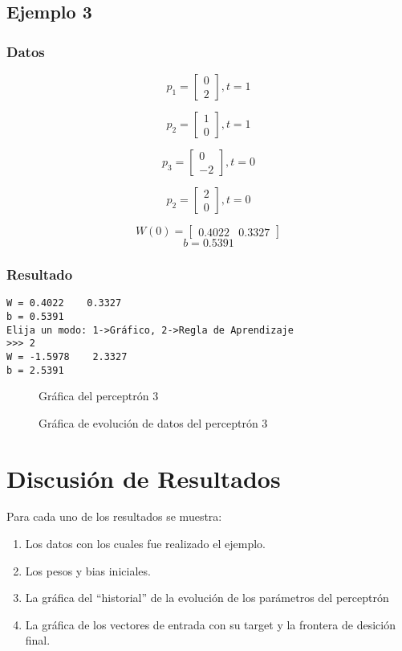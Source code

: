 \documentclass{article}
\begin{document}
\subsection{Ejemplo 3}
\subsubsection{Datos}
\[p_1=
\begin{bmatrix}
0\\
2
\end{bmatrix}
, t=1
\]

\[p_2=
\begin{bmatrix}
1\\
0
\end{bmatrix}
, t=1
\]

\[p_3=
\begin{bmatrix}
0\\
-2
\end{bmatrix}
, t=0
\]

\[p_2=
\begin{bmatrix}
2\\
0
\end{bmatrix}
, t=0
\]

\[W(0)= 
\begin{bmatrix}
0.4022  &  0.3327
\end{bmatrix}
\]
$$ b= 0.5391 $$
\subsubsection{Resultado}
\begin{lstlisting}
W = 0.4022    0.3327
b = 0.5391
Elija un modo: 1->Gráfico, 2->Regla de Aprendizaje
>>> 2
W = -1.5978    2.3327
b = 2.5391
\end{lstlisting}
\begin{figure}[htpb]
	\centering
	
	\caption{Gráfica del perceptrón 3}
\end{figure}
\begin{figure}[htpb]
	\centering
	
	\caption{Gráfica de evolución de datos del perceptrón 3}
\end{figure}
\newpage
\section{Discusión de Resultados}
Para cada uno de los resultados se muestra:
\begin{enumerate}
	\item Los datos con los cuales fue realizado el ejemplo.
	\item Los pesos y bias iniciales.
	\item La gráfica del ``historial'' de la evolución de los parámetros del perceptrón
	\item La gráfica de los vectores de entrada con su target y la frontera de desición final.
\end{enumerate}
\end{document}
